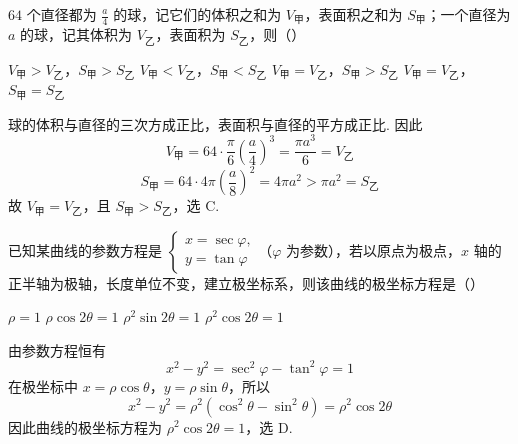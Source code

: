 \begin{problem}
\(64\) 个直径都为 \(\frac{a}{4}\) 的球，记它们的体积之和为 \(V_{\text{甲}}\)，表面积之和为 \(S_{\text{甲}}\)；一个直径为 \(a\) 的球，记其体积为 \(V_{\text{乙}}\)，表面积为 \(S_{\text{乙}}\)，则（\quad）

\choices
    {\(V_{\text{甲}}>V_{\text{乙}}\)，\(S_{\text{甲}}>S_{\text{乙}}\)}
    {\(V_{\text{甲}}<V_{\text{乙}}\)，\(S_{\text{甲}}<S_{\text{乙}}\)}
    {\(V_{\text{甲}}=V_{\text{乙}}\)，\(S_{\text{甲}}>S_{\text{乙}}\)}
    {\(V_{\text{甲}}=V_{\text{乙}}\)，\(S_{\text{甲}}=S_{\text{乙}}\)}

\begin{solution}
球的体积与直径的三次方成正比，表面积与直径的平方成正比. 因此
\[
V_{\text{甲}}=64\cdot\frac{\pi}{6}\left(\frac a4\right)^{3}=\frac{\pi a^{3}}6=V_{\text{乙}}
\]
\[
S_{\text{甲}}=64\cdot4\pi\left(\frac a8\right)^{2}=4\pi a^{2}>\pi a^{2}=S_{\text{乙}}
\]
故 \(V_{\text{甲}}=V_{\text{乙}}\)，且 \(S_{\text{甲}}>S_{\text{乙}}\)，选 C.
\end{solution}
\end{problem}

\begin{problem}
已知某曲线的参数方程是 \(\begin{cases}
x=\sec\varphi,\\
y=\tan\varphi
\end{cases}\)（\(\varphi\) 为参数），若以原点为极点，\(x\) 轴的正半轴为极轴，长度单位不变，建立极坐标系，则该曲线的极坐标方程是（\quad）

\choices
    {\(\rho=1\)}
    {\(\rho\cos 2\theta=1\)}
    {\(\rho^{2}\sin 2\theta=1\)}
    {\(\rho^{2}\cos 2\theta=1\)}

\begin{solution}
由参数方程恒有
\[
x^{2}-y^{2}=\sec^{2}\varphi-\tan^{2}\varphi=1
\]
在极坐标中 \(x=\rho\cos\theta\)，\(y=\rho\sin\theta\)，所以
\[
x^{2}-y^{2}=\rho^{2}(\cos^{2}\theta-\sin^{2}\theta)=\rho^{2}\cos2\theta
\]
因此曲线的极坐标方程为 \(\rho^{2}\cos2\theta=1\)，选 D.
\end{solution}
\end{problem}

